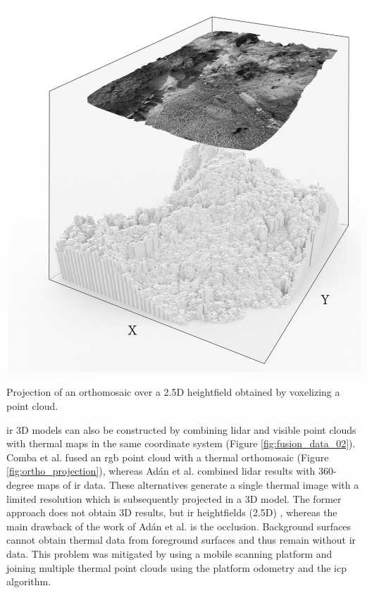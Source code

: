\begin{marginfigure}[-5cm]
	\includegraphics{figs/context/orthomosaic_projection.png}
	\caption{Projection of an orthomosaic over a 2.5D heightfield obtained by voxelizing a point cloud.}
	\label{fig:ortho_projection}
\end{marginfigure}
\acrshort{ir} 3D models can also be constructed by combining \acrshort{lidar} and visible point clouds with thermal maps in the same coordinate system (Figure \ref{fig:fusion_data_02}). Comba et al. \cite{comba_2d_2019} fused an \acrshort{rgb} point cloud with a thermal orthomosaic (Figure \ref{fig:ortho_projection}), whereas Adán et al. \cite{adan_towards_2020} combined \acrshort{lidar} results with 360-degree maps of \acrshort{ir} data. These alternatives generate a single thermal image with a limited resolution which is subsequently projected in a 3D model. The former approach does not obtain 3D results, but \acrshort{ir} heightfields (2.5D) \cite{juszczyk_wound_2021}, whereas the main drawback of the work of Adán et al. \cite{adan_towards_2020} is the occlusion. Background surfaces cannot obtain thermal data from foreground surfaces and thus remain without \acrshort{ir} data. This problem was mitigated by using a mobile scanning platform and joining multiple thermal point clouds using the platform odometry and the \acrshort{icp} algorithm. 

